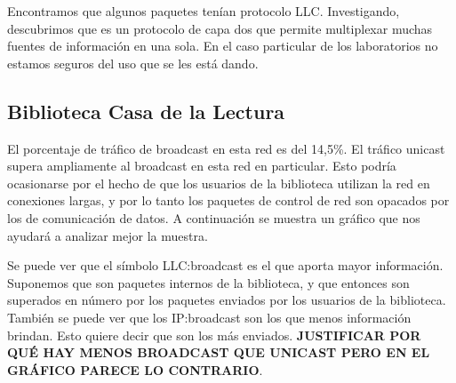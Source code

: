 
Encontramos que algunos paquetes tenían protocolo LLC. Investigando, descubrimos
que es un protocolo de capa dos que permite multiplexar muchas fuentes de
información en una sola. En el caso particular de los laboratorios no
estamos seguros del uso que se les está dando.





\subsection{Biblioteca Casa de la Lectura}

El porcentaje de tráfico de broadcast en esta red es del 14,5\%. El tráfico unicast supera ampliamente
al broadcast en esta red en particular. Esto podría ocasionarse por el hecho de que los
usuarios de la biblioteca utilizan la red en conexiones largas, y por lo tanto los paquetes
de control de red son opacados por los de comunicación de datos. A continuación se muestra un
gráfico que nos ayudará a analizar mejor la muestra.



Se puede ver que el símbolo LLC:broadcast es el que aporta mayor información.
Suponemos que son paquetes internos de la biblioteca, y que entonces son
superados en número por los paquetes enviados por los usuarios de la biblioteca.
También se puede ver que los IP:broadcast son los que menos información brindan.
Esto quiere decir que son los más enviados. 
\textbf{JUSTIFICAR POR QUÉ HAY MENOS BROADCAST QUE UNICAST PERO EN EL GRÁFICO
PARECE LO CONTRARIO}.


